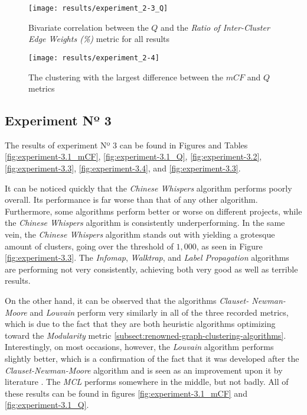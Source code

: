 \documentclass[12pt,a4paper]{report}
\begin{document}
\begin{figure}[htbp]
\centering
\texttt{[image: results/experiment\_2-3\_Q]}
\caption{Bivariate correlation between the $Q$ and the \textit{Ratio of Inter-Cluster Edge Weights (\%)} metric for all results}
\label{fig:experiment-2.3_Q}
\end{figure}

\begin{figure}[htbp]
\centering
\texttt{[image: results/experiment\_2-4]}
\caption{The clustering with the largest difference between the $mCF$ and $Q$ metrics}
\label{fig:experiment-2.4}
\end{figure}


\subsection{Experiment Nº 3}

The results of experiment Nº 3 can be found in Figures and Tables
\ref{fig:experiment-3.1_mCF}, \ref{fig:experiment-3.1_Q}, \ref{fig:experiment-3.2},
\ref{fig:experiment-3.3}, \ref{fig:experiment-3.4}, and \ref{fig:experiment-3.3}.

It can be noticed quickly that the \textit{Chinese Whispers} algorithm performs
poorly overall. Its performance is far worse than that of any other algorithm.
Furthermore, some algorithms perform better or worse on different projects,
while the \textit{Chinese Whispers} algorithm is consistently underperforming.
In the same vein, the \textit{Chinese Whispers} algorithm stands out with
yielding a grotesque amount of clusters, going over the threshold of $1,000$,
as seen in Figure \ref{fig:experiment-3.3}. The \textit{Infomap},
\textit{Walktrap}, and \textit{Label Propagation} algorithms are performing not
very consistently, achieving both very good as well as terrible results.

On the other hand, it can be observed that the algorithms \textit{Clauset\hyp
Newman-Moore} and \textit{Louvain} perform very similarly in all of the three
recorded metrics, which is due to the fact that they are both heuristic
algorithms optimizing toward the \textit{Modularity} metric
\ref{subsect:renowned-graph-clustering-algorithms}. Interestingly, on most occasions,
however, the \textit{Louvain} algorithm performs slightly better, which is a
confirmation of the fact that it was developed after the \textit{Clauset-Newman-Moore}
algorithm and is seen as an improvement upon it by literature
\cite{lancichinetti2009community}. The \textit{MCL} performs somewhere in the middle,
but not badly. All of these results can be found in figures
\ref{fig:experiment-3.1_mCF} and \ref{fig:experiment-3.1_Q}.
\end{document}
